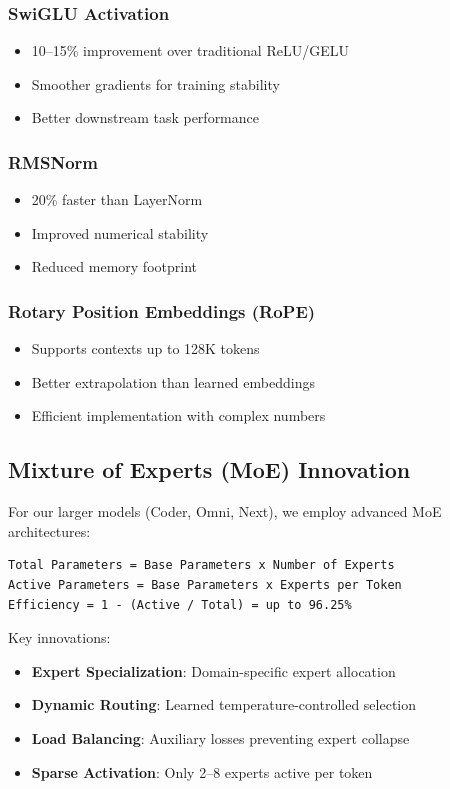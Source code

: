 \documentclass[11pt,a4paper]{article}
\begin{document}
\subsubsection{SwiGLU Activation}
\begin{itemize}
    \item 10--15\% improvement over traditional ReLU/GELU
    \item Smoother gradients for training stability
    \item Better downstream task performance
\end{itemize}

\subsubsection{RMSNorm}
\begin{itemize}
    \item 20\% faster than LayerNorm
    \item Improved numerical stability
    \item Reduced memory footprint
\end{itemize}

\subsubsection{Rotary Position Embeddings (RoPE)}
\begin{itemize}
    \item Supports contexts up to 128K tokens
    \item Better extrapolation than learned embeddings
    \item Efficient implementation with complex numbers
\end{itemize}

\subsection{Mixture of Experts (MoE) Innovation}

For our larger models (Coder, Omni, Next), we employ advanced MoE architectures:

\begin{lstlisting}
Total Parameters = Base Parameters x Number of Experts
Active Parameters = Base Parameters x Experts per Token
Efficiency = 1 - (Active / Total) = up to 96.25%
\end{lstlisting}

Key innovations:
\begin{itemize}
    \item \textbf{Expert Specialization}: Domain-specific expert allocation
    \item \textbf{Dynamic Routing}: Learned temperature-controlled selection
    \item \textbf{Load Balancing}: Auxiliary losses preventing expert collapse
    \item \textbf{Sparse Activation}: Only 2--8 experts active per token
\end{itemize}
\end{document}
